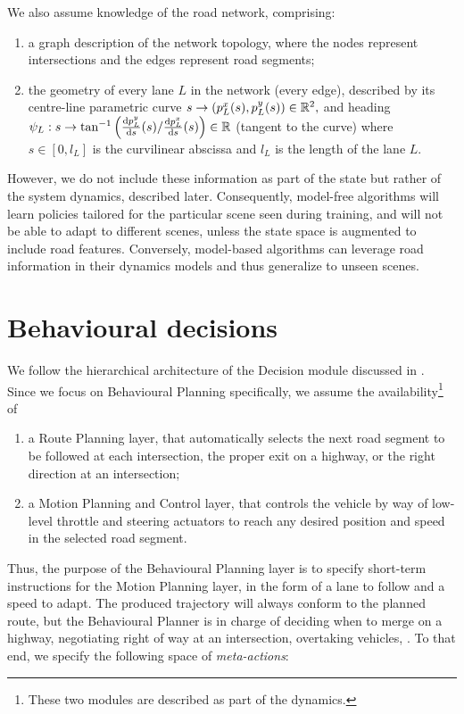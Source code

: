 We also assume knowledge of the road network, comprising:
\begin{enumerate}[label=(\roman*)]
	\item a graph description of the network topology, where the nodes represent intersections and the edges represent road segments;
	\item the geometry of every lane $L$ in the network (every edge), described by its centre-line parametric curve
	$
	s \rightarrow (p^x_{L}(s), p^y_{L}(s))\in \mathbb{R}^2,
	$
	\noindent and heading $\psi_L:s \rightarrow \tan^{-1}\left({\odv{p^y_{L}}{s}(s)}/{\odv{p^x_{L}}{s}(s)}\right) \in \Real$
	(tangent to the curve) where $s\in[0, l_L]$ is the curvilinear abscissa and $l_L$ is the length of the lane $L$.
\end{enumerate}

However, we do not include these information as part of the state but rather of the system dynamics, described later. Consequently, model-free algorithms will learn policies tailored for the particular scene seen during training, and will not be able to adapt to different scenes, unless the state space is augmented to include road features. Conversely, model-based algorithms can leverage road information in their dynamics models and thus generalize to unseen scenes.

\section{Behavioural decisions}

We follow the hierarchical architecture of the Decision module discussed in . Since we focus on Behavioural Planning specifically, we assume the availability\footnote{These two modules are described as part of the dynamics.} of
\begin{enumerate}[label=(\roman*)]
	\item a Route Planning layer, that automatically selects the next road segment to be followed at each intersection, \eg the proper exit on a highway, or the right direction at an intersection;
	\item a Motion Planning and Control layer, that controls the vehicle by way of low-level throttle and steering actuators to reach any desired position and speed in the selected road segment. 
\end{enumerate}

Thus, the purpose of the Behavioural Planning layer is to specify short-term instructions for the Motion Planning layer, in the form of a lane to follow and a speed to adapt. The produced trajectory will always conform to the planned route, but the Behavioural Planner is in charge of \eg deciding when to merge on a highway, negotiating right of way at an intersection, overtaking vehicles, \etc. To that end, we specify the following space of \emph{meta-actions}:

